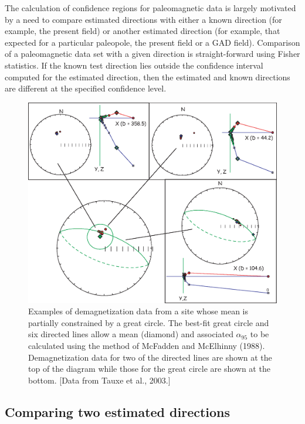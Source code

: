 The calculation of confidence regions for paleomagnetic
data is largely motivated by a need to compare  estimated directions with
either a known direction (for example, the present field) or another estimated
direction (for example, that expected for a particular paleopole, the present field or a GAD field). 
Comparison of a paleomagnetic data set with a given direction is  
straight-forward using Fisher statistics. 
 If the known test direction lies outside the
confidence interval computed for the estimated direction, then the estimated and
known directions are different at the specified confidence level. 

\begin{figure}[h!tb]
\centering  \includegraphics[width= 14 cm]{EPSfiles/lnp.eps}
\caption{
Examples of demagnetization data from a site whose mean is partially
constrained by  a great circle. 
 The best-fit great
circle and six directed lines allow a mean (diamond) and 
associated $\alpha_{95}$ to
be calculated using the method of 
%
McFadden and 
%
McElhinny (1988).   Demagnetization data for two of the directed lines are shown at the top of the diagram while those for the great circle are shown at the bottom.  [Data from Tauxe et al., 2003.]  
}
\label{fig:lnp}
\end{figure} \nocite{tauxe03b}

\subsection {Comparing two estimated directions}

